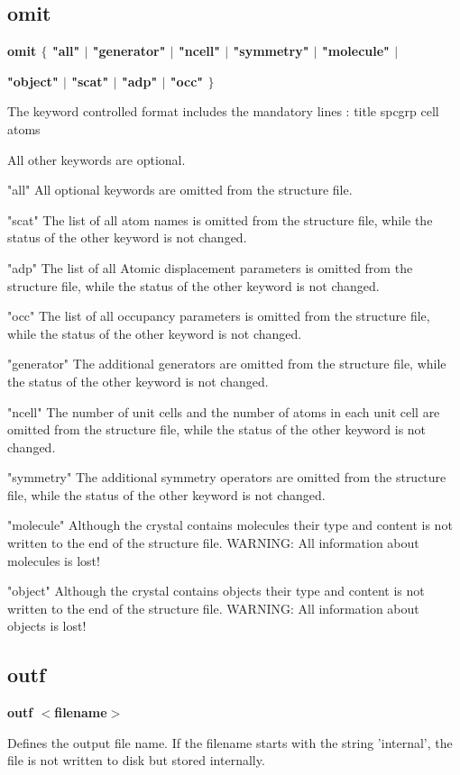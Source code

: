 \subsection*{omit}
{\bf omit $ \{$ "all" $| $ "generator" $| $ "ncell" $| $ "symmetry" $| $ "molecule" $| $ \par }
{\bf         "object" $| $ "scat" $| $ "adp" $| $ "occ" $\} $ \par }
\par
\vspace{3pt}
The keyword controlled format includes the mandatory lines : 
title 
spcgrp 
cell 
atoms 
\par
All other keywords are optional. 
\par
"all"        All optional keywords are omitted from the structure 
             file. 
\par
"scat"       The list of all atom names is omitted from the structure 
             file, while the status of the other keyword is not changed. 
\par
"adp"        The list of all Atomic displacement parameters is omitted 
             from the structure file, while the status of the other 
             keyword is not changed. 
\par
"occ"        The list of all occupancy parameters is omitted 
             from the structure file, while the status of the other 
             keyword is not changed. 
\par
"generator"  The additional generators are omitted from the structure 
             file, while the status of the other keyword is not changed. 
\par
"ncell"      The number of unit cells and the number of atoms in each 
             unit cell are omitted from the structure file, while the 
             status of the other keyword is not changed. 
\par
"symmetry"   The additional symmetry operators are omitted from the 
             structure file, while the status of the other keyword is 
             not changed. 
\par
"molecule"   Although the crystal contains molecules their type and 
             content is not written to the end of the structure file. 
             WARNING: All information about molecules is lost! 
\par
"object"     Although the crystal contains objects their type and 
             content is not written to the end of the structure file. 
             WARNING: All information about objects is lost! 
\subsection*{outf}
{\bf outf $ <$filename$> $ \par }
\par
\vspace{3pt}
Defines the output file name. 
If the filename starts with the string 'internal', the file is not 
written to disk but stored internally. 
